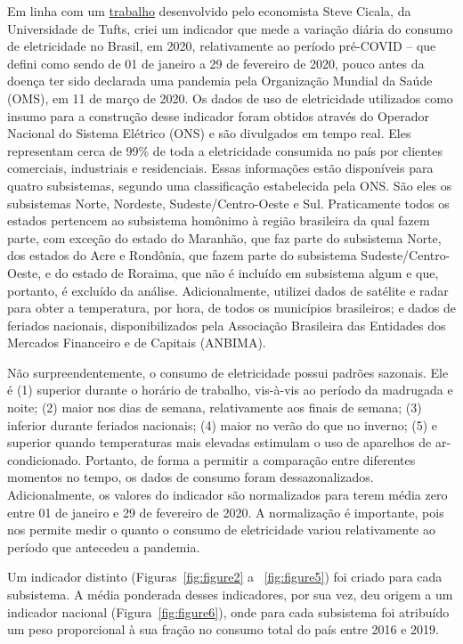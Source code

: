 \documentclass[12pt]{article}
\begin{document}
Em linha com um \href{https://home.uchicago.edu/~scicala/papers/real_time_EU/real_time_EU.pdf}{trabalho} desenvolvido pelo economista Steve Cicala, da Universidade de Tufts, criei um indicador que mede a variação diária do consumo de eletricidade no Brasil, em 2020, relativamente ao período pré-COVID -- que defini como sendo de 01 de janeiro a 29 de fevereiro de 2020, pouco antes da doença ter sido declarada uma pandemia pela Organização Mundial da Saúde (OMS), em 11 de março de 2020. Os dados de uso de eletricidade utilizados como insumo para a construção desse indicador foram obtidos através do Operador Nacional do Sistema Elétrico (ONS) e são divulgados em tempo real. Eles representam cerca de 99\% de toda a eletricidade consumida no país por clientes comerciais, industriais e residenciais. Essas informações estão disponíveis para quatro subsistemas, segundo uma classificação estabelecida pela ONS. São eles os subsistemas Norte, Nordeste, Sudeste/Centro-Oeste e Sul. Praticamente todos os estados pertencem ao subsistema homônimo à região brasileira da qual fazem parte, com exceção do estado do Maranhão, que faz parte do subsistema Norte, dos estados do Acre e Rondônia, que fazem parte do subsistema Sudeste/Centro-Oeste, e do estado de Roraima, que não é incluído em subsistema algum e que, portanto, é excluído da análise. Adicionalmente, utilizei dados de satélite e radar para obter a temperatura, por hora, de todos os municípios brasileiros; e dados de feriados nacionais, disponibilizados pela Associação Brasileira das Entidades dos Mercados Financeiro e de Capitais (ANBIMA).

Não surpreendentemente, o consumo de eletricidade possui padrões sazonais. Ele é (1) superior durante o horário de trabalho, vis-à-vis ao período da madrugada e noite; (2) maior nos dias de semana, relativamente aos finais de semana; (3) inferior durante feriados nacionais; (4) maior no verão do que no inverno; (5) e superior quando temperaturas mais elevadas estimulam o uso de aparelhos de ar-condicionado. Portanto, de forma a permitir a comparação entre diferentes momentos no tempo, os dados de consumo foram dessazonalizados. Adicionalmente, os valores do indicador são normalizados para terem média zero entre 01 de janeiro e 29 de fevereiro de 2020. A normalização é importante, pois nos permite medir o quanto o consumo de eletricidade variou relativamente ao período que antecedeu a pandemia. 

Um indicador distinto (Figuras~{\ref{fig:figure2}} a ~{\ref{fig:figure5}}) foi criado para cada subsistema. A média ponderada desses indicadores, por sua vez, deu origem a um indicador nacional (Figura~{\ref{fig:figure6}}), onde para cada subsistema foi atribuído um peso proporcional à sua fração no consumo total do país entre 2016 e 2019. \vspace{5pt}
\end{document}
